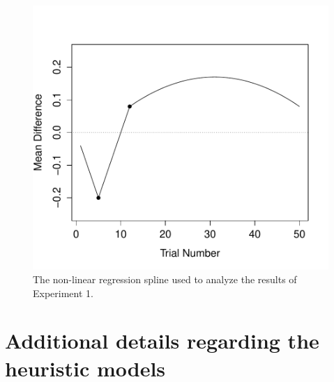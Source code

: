 \documentclass[authoryear]{elsarticle}
\begin{document}
\begin{figure}[t]
\begin{center}
\includegraphics[scale=0.5]{regressionModel.pdf}
\caption{The non-linear regression spline used to analyze the results of Experiment 1.}
\label{fig:spline}
\end{center}
\end{figure}




\section{Additional details regarding the heuristic models}
\end{document}
